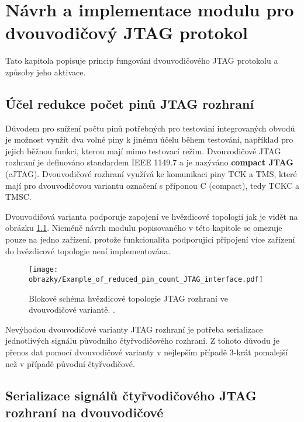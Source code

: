 
\chapter{Návrh a implementace modulu pro dvouvodičový JTAG protokol}
Tato kapitola popisuje princip fungování dvouvodičového \acs{JTAG} protokolu a způsoby jeho aktivace.

\section{Účel redukce počet pinů \acs{JTAG} rozhraní}	\label{sec:2w_interface}
Důvodem pro snížení počtu pinů potřebných pro testování integrovaných obvodů je možnost využít dva volné piny k jinému účelu během testování, například pro jejich běžnou funkci, kterou mají mimo testovací režim. Dvouvodičové \acs{JTAG} rozhraní je definováno standardem IEEE 1149.7 a je nazýváno \textbf{compact \acs{JTAG}} (c\acs{JTAG}). Dvouvodičové rozhraní využívá ke komunikaci piny \acs{TCK} a \acs{TMS}, které mají pro dvouvodičovou variantu označení s příponou C (compact), tedy TCKC a TMSC. \cite{IEEE_1149-7} \cite{JTAG}

Dvouvodičová varianta podporuje zapojení ve hvězdicové topologii jak je vidět na obrázku \ref{fig:star2_sch}. Nicméně návrh modulu popisovaného v této kapitole se omezuje pouze na jedno zařízení, protože funkcionalita podporující připojení více zařízení do hvězdicové topologie není implementována.

\begin{figure}[!h]
  \begin{center}
    \texttt{[image: obrazky/Example\_of\_reduced\_pin\_count\_JTAG\_interface.pdf]}
  \end{center}
  \caption{Blokové schéma hvězdicové topologie \acs{JTAG} rozhraní ve dvouvodičové variantě. \cite{JTAG}.}
	\label{fig:star2_sch}
\end{figure}

Nevýhodou dvouvodičové varianty \acs{JTAG} rozhraní je potřeba serializace jednotlivých signálu původního čtyřvodičového rozhraní. Z tohoto důvodu je přenos dat pomocí dvouvodičové varianty v nejlepším případě 3-krát pomalejší než v případě původní čtyřvodičové. \cite{IEEE_1149-7}
\section{Serializace signálů čtyřvodičového \acs{JTAG} rozhraní na dvouvodičové}	\label{sec:oscan1} 

